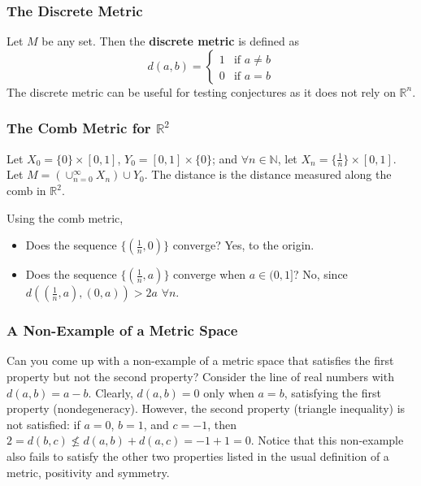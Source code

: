 \documentclass[12pt]{amsart}
\begin{document}
\subsubsection{The Discrete Metric} Let $M$ be any set. Then the \textbf{discrete metric} is defined as
	\begin{displaymath}
		  d(a,b) = \left\{
     						\begin{array}{lr}
       						1 & \text{if } a \neq b \\
       						0 & \text{if } a = b
     							\end{array}
   						 \right.
	\end{displaymath}
The discrete metric can be useful for testing conjectures as it does not rely on $\mathbb{R}^n$.

\subsubsection{The Comb Metric for $\mathbb{R}^2$} Let $X_0 = \{ 0 \} \times [0,1]$, $Y_0 = [0,1] \times \{ 0 \}$; and $\forall n \in \mathbb{N}$, let $X_n = \{ \frac{1}{n} \} \times [0,1]$. Let $M = (\cup_{n=0}^\infty X_n) \cup Y_0$. The distance is the distance measured along the comb in $\mathbb{R}^2$.  
\vspace{5cm}

\noindent Using the comb metric,
\begin{itemize}
	\item Does the sequence $\{ (\frac{1}{n},0) \}$ converge? Yes, to the origin.
	\item Does the sequence $\{ (\frac{1}{n},a) \}$ converge when $a \in (0,1]$? No, since $d((\frac{1}{n},a),(0,a)) > 2a$ $\forall n$.
\end{itemize}

\subsubsection{A Non-Example of a Metric Space} Can you come up with a non-example of a metric space that satisfies the first property but not the second property? Consider the line of real numbers with $d(a,b) = a-b$. Clearly, $d(a,b)=0$ only when $a=b$, satisfying the first property (nondegeneracy). However, the second property (triangle inequality) is not satisfied: if $a=0$, $b=1$, and $c=-1$, then $2=d(b,c) \nleq d(a,b)+d(a,c)=-1+1=0$. Notice that this non-example also fails to satisfy the other two properties listed in the usual definition of a metric, positivity and symmetry.
\end{document}
